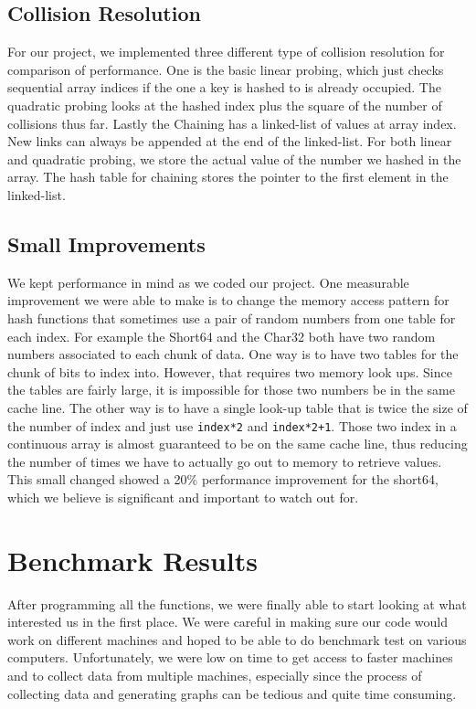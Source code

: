 \documentclass[11pt]{article}
\begin{document}
\subsection{Collision Resolution}
For our project, we implemented three different type of collision resolution
for comparison of performance. One is the basic linear probing, which 
just checks sequential array indices if the one a key is hashed to is already occupied.
The quadratic probing looks at the hashed index plus the square of 
the number of collisions thus far. Lastly the Chaining has a linked-list of values at array
index. New links can always be appended at the end of the linked-list.
For both linear and quadratic probing, we store the actual value of the number we
hashed in the array. The hash table for chaining stores the pointer to the first element
in the linked-list.

\subsection{Small Improvements}
We kept performance in mind as we coded our project. One measurable improvement
we were able to make is to change the memory access pattern for hash functions that 
sometimes use a pair of random numbers from one table for each index. For example
the Short64 and the Char32 both have two random numbers associated to each chunk of data.
One way is to have two tables for the chunk of bits to index into. However, that requires two 
memory look ups. Since the tables are fairly large, it is impossible for those two numbers 
be in the same cache line. The other way is to have a single look-up table that is twice the size
of the number of index and just use \texttt{index*2} and \texttt{index*2+1}. 
Those two index in a continuous array is almost guaranteed to be on the 
same cache line, thus reducing the number of times we have to actually 
go out to memory to retrieve values. This small changed showed a 20\% performance improvement 
for the short64, which we believe is significant and important to watch out for.


\section{Benchmark Results}
After programming all the functions, we were finally able to start looking at 
what interested us in the first place. We were careful in making sure our code 
would work on different machines and hoped to be able to do benchmark test 
on various computers. Unfortunately, we were low on time to get access to 
faster machines and to
collect data from multiple machines, especially since the process of collecting data
and generating graphs can be tedious and quite time consuming. 
\end{document}
